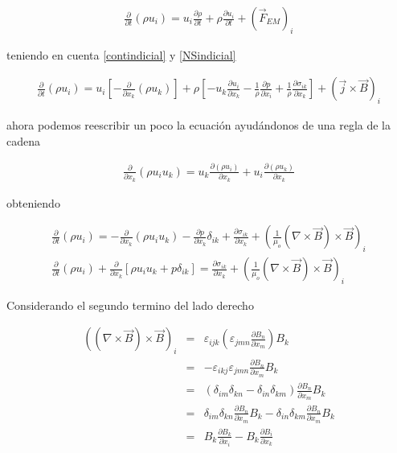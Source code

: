 \begin{eqnarray}
\frac{\partial}{\partial t}(\rho u_{i}) = u_{i}\frac{\partial 
\rho}{\partial t} + \rho \frac{\partial u_{i}}{\partial t} + (\vec{F}_{EM})_{i} 
\end{eqnarray}

\noindent teniendo en cuenta \eqref{contindicial} y \eqref{NSindicial}

\begin{eqnarray}
\frac{\partial}{\partial t}(\rho u_{i}) = u_{i}\left[-\frac{\partial}{\partial x_{k}}(\rho u_{k})\right] + \rho\left[-u_{k}\frac{\partial u_{i}}{\partial x_{k}} - \frac{1}{\rho}\frac{\partial p}{\partial x_{i}} + \frac{1}{\rho}\frac{\partial \sigma_{ik}}{\partial x_{k}}\right] + (\vec{j}\times\vec{B})_{i}\nonumber
\end{eqnarray}

\noindent ahora podemos reescribir un poco la ecuación ayudándonos de una regla de la cadena

\begin{eqnarray}
\frac{\partial}{\partial x_{k}}(\rho u_{i}u_{k}) = u_{k}\frac{\partial(\rho u_{i})}{\partial x_{k}}+u_{i}\frac{\partial(\rho u_{k})}{\partial x_{k}}\nonumber
\end{eqnarray}

\noindent obteniendo

\begin{eqnarray}
\frac{\partial}{\partial t}(\rho u_{i}) = -\frac{\partial}{\partial x_{k}}(\rho u_{i}u_{k})-\frac{\partial p}{\partial x_{k}}\delta_{ik} + \frac{\partial \sigma_{ik}}{\partial x_{k}}+ \left(\frac{1}{\mu_{o}}(\nabla\times\vec{B})\times\vec{B}\right)_{i}\nonumber\\
\label{momentos1}
\frac{\partial}{\partial t}(\rho u_{i})+\frac{\partial}{\partial x_{k}}\left[\rho u_{i}u_{k}+p\delta_{ik}\right] = \frac{\partial \sigma_{ik}}{\partial x_{k}}+\left(\frac{1}{\mu_{o}}(\nabla\times\vec{B})\times\vec{B}\right)_{i}
\end{eqnarray}

\noindent Considerando el segundo termino del lado derecho

\begin{eqnarray}
\left((\nabla\times\vec{B})\times\vec{B}\right)_{i}&=&\varepsilon_{ijk}\left(\varepsilon_{jmn}\frac{\partial B_{n}}{\partial x_{m}}\right)B_{k}\nonumber\\
&=&-\varepsilon_{ikj}\varepsilon_{jmn}\frac{\partial B_{n}}{\partial x_{m}}B_{k}\nonumber\\
&=&(\delta_{im}\delta_{kn}-\delta_{in}\delta_{km})\frac{\partial B_{n}}{\partial x_{m}}B_{k}\nonumber\\
&=&\delta_{im}\delta_{kn}\frac{\partial B_{n}}{\partial x_{m}}B_{k}-\delta_{in}\delta_{km}\frac{\partial B_{n}}{\partial x_{m}}B_{k}\nonumber\\
&=&B_{k}\frac{\partial B_{k}}{\partial x_{i}}-B_{k}\frac{\partial B_{i}}{\partial x_{k}}
\end{eqnarray}

